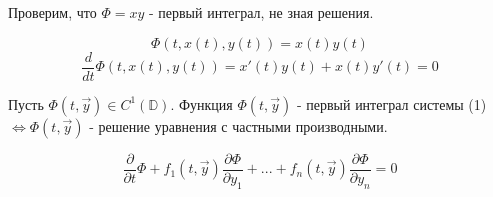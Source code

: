 \documentclass[12pt, a4paper]{report}
\begin{document}
Проверим, что \( \Phi = xy  \) - первый интеграл, не зная решения. 

\[ \Phi(t, x(t ), y(t )) = x(t )  y(t ) \] 
\[ \frac{d}{dt }  \Phi(t, x(t ), y(t )) = x' (t )y (t ) + x(t ) y'(t ) =0 \] 

\begin{theorem}
    Пусть \( \Phi(t,\vec{y } ) \in  C^1 (\mathbb{D} )  \). Функция \( \Phi(t, \vec{ y} ) \)  - первый интеграл системы (1) \( \Leftrightarrow    \Phi(t, \vec{ y} )  \) - решение уравнения с частными производными. 

    \[ \frac{\partial  }{\partial  t } \Phi + f_1 (t , \vec{ y} ) \frac{\partial  \Phi }{\partial  y_1 }+ ... + f_n (t , \vec{ y} ) \frac{\partial  \Phi }{\partial  y_n } = 0 \tag{2}    \] 
\end{theorem}
\end{document}
